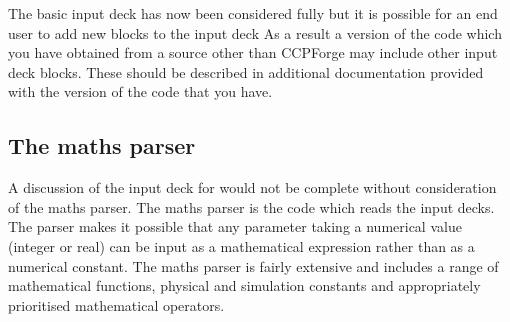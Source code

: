 \documentclass[12pt,a4paper]{article}
\newcommand{\EPOCH}{{\color{warwickdark}\fontfamily{phv}\selectfont{EPOCH}}}
\begin{document}
The basic input deck has now been considered fully but it
 is possible for an end user to add new blocks to the input deck As a result
a version of the code which you have obtained from a source other than
CCPForge may include other input deck blocks. These should be described in
additional documentation provided with the version of the code that you have.

\subsection{The maths parser}
\label{sec:maths_parser}
A discussion of the input deck for {\EPOCH} would not be complete without
consideration of the maths parser. The maths parser is the code which reads
the input decks.
The parser makes it possible that any parameter taking a
numerical value (integer or real) can be input as a mathematical expression
rather than as a numerical constant. The maths parser is fairly extensive and
includes a range of mathematical functions, physical and simulation constants
and appropriately prioritised mathematical operators.
\end{document}
